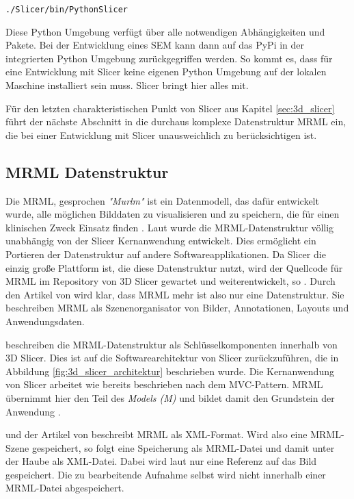 \begin{center}
	\texttt{./Slicer/bin/PythonSlicer}
\end{center}

Diese Python Umgebung verfügt über alle notwendigen Abhängigkeiten und Pakete.
Bei der Entwicklung eines \ac{SEM} kann dann auf das \ac{PyPi} in der
integrierten Python Umgebung zurückgegriffen werden. So kommt es, dass für eine
Entwicklung mit Slicer keine eigenen Python Umgebung auf der lokalen Maschine
installiert sein muss. Slicer bringt hier alles mit.

Für den letzten charakteristischen Punkt von Slicer aus Kapitel \ref{sec:3d_slicer}
führt der nächste Abschnitt in die durchaus komplexe Datenstruktur \ac{MRML} ein,
die bei einer Entwicklung mit Slicer unausweichlich zu berücksichtigen ist.

\subsection{MRML Datenstruktur}
\label{subsec:mrml_datenstruktur} Die \ac{MRML}, gesprochen \textit{"Murlm"} ist
ein Datenmodell, das dafür entwickelt wurde, alle möglichen Bilddaten zu
visualisieren und zu speichern, die für einen klinischen Zweck Einsatz finden \citep[vgl.][]{slicer2024}.
Laut \citet{slicer2024} wurde die \ac{MRML}-Datenstruktur völlig unabhängig von der
Slicer Kernanwendung entwickelt. Dies ermöglicht ein Portieren der Datenstruktur
auf andere Softwareapplikationen. Da Slicer die einzig große Plattform ist, die
diese Datenstruktur nutzt, wird der Quellcode für \ac{MRML} im Repository von 3D
Slicer gewartet und weiterentwickelt, so \citet{slicer2024}. Durch den Artikel von
\citet[S.~1]{fedorov2012slicer} wird klar, dass \ac{MRML} mehr ist also nur eine
Datenstruktur. Sie beschreiben \ac{MRML} als Szenenorganisator von Bilder, Annotationen,
Layouts und Anwendungsdaten.

\citet[S.~11]{fedorov2012slicer} beschreiben die \ac{MRML}-Datenstruktur als
Schlüsselkomponenten innerhalb von 3D Slicer. Dies ist auf die Softwarearchitektur
von Slicer zurückzuführen, die in Abbildung \ref{fig:3d_slicer_architektur}
beschrieben wurde. Die Kernanwendung von Slicer arbeitet wie bereits beschrieben
nach dem \ac{MVC}-Pattern. \ac{MRML} übernimmt hier den Teil des \textit{Models
(M)} und bildet damit den Grundstein der Anwendung \citep[vgl.][S.~25]{fedorov2012slicer}.

\citet{slicer2024} und der Artikel von \citet[S.~11]{fedorov2012slicer}
beschreibt \ac{MRML} als \ac{XML}-Format. Wird also eine \ac{MRML}-Szene
gespeichert, so folgt eine Speicherung als \ac{MRML}-Datei und damit unter der
Haube als \ac{XML}-Datei. Dabei wird laut \citet{slicer2024} nur eine Referenz auf
das Bild gespeichert. Die zu bearbeitende Aufnahme selbst wird nicht innerhalb
einer \ac{MRML}-Datei abgespeichert.

